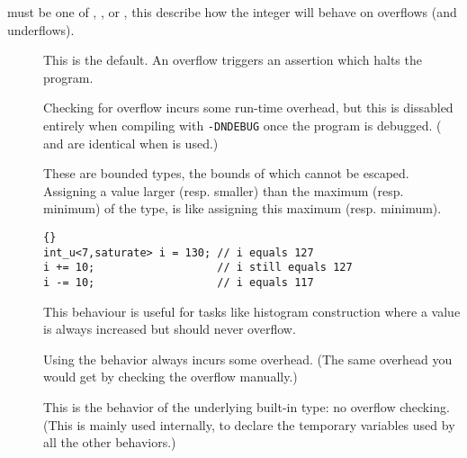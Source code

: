  must be one of , %
, or , this describe how the integer will
behave on overflows (and underflows).

\begin{description}

\item[]

This is the default.  An overflow triggers an assertion which halts
the program.

Checking for overflow incurs some run-time overhead, but this is
dissabled entirely when compiling with \texttt{-DNDEBUG} once the
program is debugged.  ( and  are identical
when  is used.)


\item[]

These are bounded types, the bounds of which cannot be escaped.
Assigning a value larger (resp. smaller) than the maximum
(resp. minimum) of the type, is like assigning this maximum
(resp. minimum).

\begin{lstlisting}{}
int_u<7,saturate> i = 130; // i equals 127
i += 10;                   // i still equals 127
i -= 10;                   // i equals 117
\end{lstlisting}

This behaviour is useful for tasks like histogram construction where a
value is always increased but should never overflow.

Using the  behavior always incurs some overhead.
(The same overhead you would get by checking the overflow manually.)

\item[]
This is the behavior of the underlying built-in type: no overflow
checking.  (This is mainly used internally, to declare the temporary
variables used by all the other behaviors.)

\end{description}

